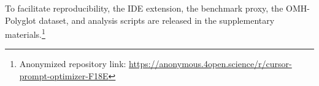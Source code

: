 \documentclass[11pt,a4paper,twocolumn]{article}
\begin{document}
To facilitate reproducibility, the IDE extension, the benchmark proxy, the OMH-Polyglot dataset, and analysis scripts are released in the supplementary materials.\footnote{Anonymized repository link: \url{https://anonymous.4open.science/r/cursor-prompt-optimizer-F18E}}



\end{document}
